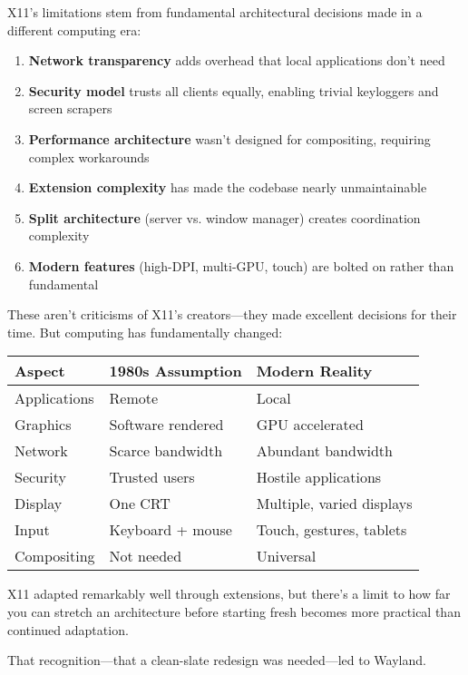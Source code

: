 X11's limitations stem from fundamental architectural decisions made in a different computing era:

\begin{enumerate}
    \item \textbf{Network transparency} adds overhead that local applications don't need
    \item \textbf{Security model} trusts all clients equally, enabling trivial keyloggers and screen scrapers
    \item \textbf{Performance architecture} wasn't designed for compositing, requiring complex workarounds
    \item \textbf{Extension complexity} has made the codebase nearly unmaintainable
    \item \textbf{Split architecture} (server vs. window manager) creates coordination complexity
    \item \textbf{Modern features} (high-DPI, multi-GPU, touch) are bolted on rather than fundamental
\end{enumerate}

These aren't criticisms of X11's creators—they made excellent decisions for their time. But computing has fundamentally changed:

\begin{center}
\begin{tabular}{l|l|l}
\toprule
\textbf{Aspect} & \textbf{1980s Assumption} & \textbf{Modern Reality} \\
\midrule
Applications & Remote & Local \\
Graphics & Software rendered & GPU accelerated \\
Network & Scarce bandwidth & Abundant bandwidth \\
Security & Trusted users & Hostile applications \\
Display & One CRT & Multiple, varied displays \\
Input & Keyboard + mouse & Touch, gestures, tablets \\
Compositing & Not needed & Universal \\
\bottomrule
\end{tabular}
\end{center}

X11 adapted remarkably well through extensions, but there's a limit to how far you can stretch an architecture before starting fresh becomes more practical than continued adaptation.

That recognition—that a clean-slate redesign was needed—led to Wayland.

